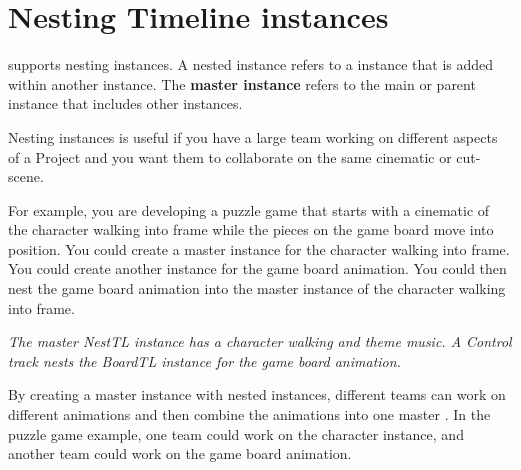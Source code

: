 \chapter{Nesting Timeline instances}
\hypertarget{md__library_2_package_cache_2com_8unity_8timeline_0d1_87_86_2_documentation_0i_2wf__nested}{}\label{md__library_2_package_cache_2com_8unity_8timeline_0d1_87_86_2_documentation_0i_2wf__nested}
\label{md__library_2_package_cache_2com_8unity_8timeline_0d1_87_86_2_documentation_0i_2wf__nested_autotoc_md1273}%
%
  supports nesting  instances. A nested  instance refers to a  instance that is added within another  instance. The {\bfseries{master  instance}} refers to the main or parent  instance that includes other  instances.

Nesting  instances is useful if you have a large team working on different aspects of a Project and you want them to collaborate on the same cinematic or cut-\/scene.

For example, you are developing a puzzle game that starts with a cinematic of the character walking into frame while the pieces on the game board move into position. You could create a master  instance for the character walking into frame. You could create another  instance for the game board animation. You could then nest the game board animation into the master  instance of the character walking into frame.



{\itshape The master Nest\+TL  instance has a character walking and theme music. A Control track nests the Board\+TL  instance for the game board animation.}

By creating a master  instance with nested  instances, different teams can work on different animations and then combine the animations into one master . In the puzzle game example, one team could work on the character  instance, and another team could work on the game board animation.

